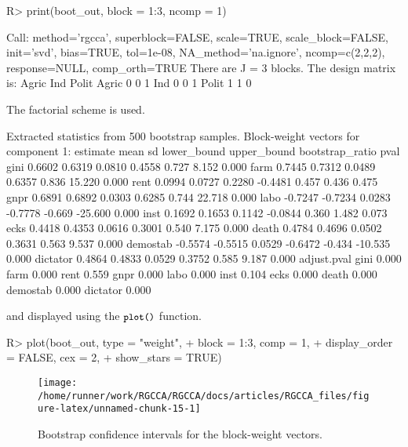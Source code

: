 \documentclass[
]{jss}
\begin{document}
\begin{CodeChunk}
\begin{CodeInput}
R> print(boot_out, block = 1:3, ncomp = 1)
\end{CodeInput}
\begin{CodeOutput}
Call: method='rgcca', superblock=FALSE, scale=TRUE, scale_block=FALSE, init='svd',
bias=TRUE, tol=1e-08, NA_method='na.ignore', ncomp=c(2,2,2), response=NULL,
comp_orth=TRUE 
There are J = 3 blocks.
The design matrix is:
      Agric Ind Polit
Agric     0   0     1
Ind       0   0     1
Polit     1   1     0

The factorial scheme is used.

Extracted statistics from 500 bootstrap samples.
Block-weight vectors for component 1: 
         estimate    mean     sd lower_bound upper_bound bootstrap_ratio  pval
gini       0.6602  0.6319 0.0810      0.4558       0.727           8.152 0.000
farm       0.7445  0.7312 0.0489      0.6357       0.836          15.220 0.000
rent       0.0994  0.0727 0.2280     -0.4481       0.457           0.436 0.475
gnpr       0.6891  0.6892 0.0303      0.6285       0.744          22.718 0.000
labo      -0.7247 -0.7234 0.0283     -0.7778      -0.669         -25.600 0.000
inst       0.1692  0.1653 0.1142     -0.0844       0.360           1.482 0.073
ecks       0.4418  0.4353 0.0616      0.3001       0.540           7.175 0.000
death      0.4784  0.4696 0.0502      0.3631       0.563           9.537 0.000
demostab  -0.5574 -0.5515 0.0529     -0.6472      -0.434         -10.535 0.000
dictator   0.4864  0.4833 0.0529      0.3752       0.585           9.187 0.000
         adjust.pval
gini           0.000
farm           0.000
rent           0.559
gnpr           0.000
labo           0.000
inst           0.104
ecks           0.000
death          0.000
demostab       0.000
dictator       0.000
\end{CodeOutput}
\end{CodeChunk}

\normalsize

and displayed using the \(\small{\texttt{plot()}}\) function.

\footnotesize

\begin{CodeChunk}
\begin{CodeInput}
R> plot(boot_out, type = "weight", 
+      block = 1:3, comp = 1, 
+      display_order = FALSE, cex = 2,
+      show_stars = TRUE)
\end{CodeInput}
\begin{figure}[H]

{\centering \texttt{[image: /home/runner/work/RGCCA/RGCCA/docs/articles/RGCCA\_files/figure-latex/unnamed-chunk-15-1]} 

}

\caption[Bootstrap confidence intervals for the block-weight vectors]{Bootstrap confidence intervals for the block-weight vectors.}\label{fig:unnamed-chunk-15}
\end{figure}
\end{CodeChunk}
\end{document}
